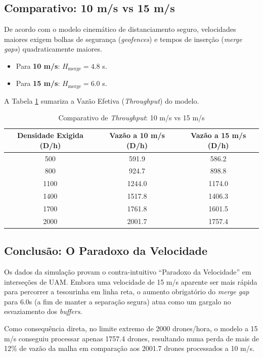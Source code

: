 \documentclass[12pt,a4paper]{article}
\begin{document}
\subsection{Comparativo: 10 m/s vs 15 m/s}

De acordo com o modelo cinemático de distanciamento seguro, velocidades maiores exigem bolhas de segurança (\textit{geofences}) e tempos de inserção (\textit{merge gaps}) quadraticamente maiores.
\begin{itemize}
    \item Para \textbf{10 m/s}: $H_{\text{merge}} = 4.8$ s.
    \item Para \textbf{15 m/s}: $H_{\text{merge}} = 6.0$ s.
\end{itemize}

A Tabela \ref{tab:resultados_simulacao} sumariza a Vazão Efetiva (\textit{Throughput}) do modelo.

\begin{table}[H]
\centering
\caption{Comparativo de \textit{Throughput}: 10 m/s vs 15 m/s}
\label{tab:resultados_simulacao}
\begin{tabular}{ccc}
\toprule
\textbf{Densidade Exigida (D/h)} & \textbf{Vazão a 10 m/s (D/h)} & \textbf{Vazão a 15 m/s (D/h)} \\
\midrule
500 & 591.9 & 586.2 \\
800 & 924.7 & 898.8 \\
1100 & 1244.0 & 1174.0 \\
1400 & 1517.8 & 1406.3 \\
1700 & 1761.8 & 1601.5 \\
2000 & 2001.7 & 1757.4 \\
\bottomrule
\end{tabular}
\end{table}

\subsection{Conclusão: O Paradoxo da Velocidade}

Os dados da simulação provam o contra-intuitivo ``Paradoxo da Velocidade'' em interseções de UAM. Embora uma velocidade de 15 m/s aparente ser mais rápida para percorrer a tesourinha em linha reta, o aumento obrigatório do \textit{merge gap} para 6.0s (a fim de manter a separação segura) atua como um gargalo no esvaziamento dos \textit{buffers}. 

Como consequência direta, no limite extremo de 2000 drones/hora, o modelo a 15 m/s conseguiu processar apenas 1757.4 drones, resultando numa perda de mais de 12\% de vazão da malha em comparação aos 2001.7 drones processados a 10 m/s. 
\end{document}
